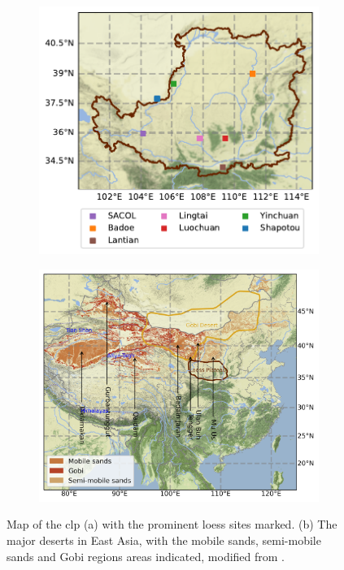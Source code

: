 \begin{figure}[htpb]
    \begin{subfigure}[b]{0.38\textwidth}
        \centering
        \includegraphics[width=\textwidth]{texfiles/figs/map_loess.pdf}
        \label{fig:map_clp_locations}
        \caption{}
    \end{subfigure}
    \hfill
    \begin{subfigure}[b]{0.58\textwidth}
        \centering
        \includegraphics[width=\textwidth]{texfiles/figs/map_sources_china.png}
        \label{fig:map_deserts}
        \caption{}
    \end{subfigure}
    
    \caption{Map of the \acrshort{clp} (a) with the prominent loess sites marked. (b) The major deserts in East Asia, with the mobile sands, semi-mobile sands and Gobi regions areas indicated, modified from \textcite{mao2013numerical}. }
    \label{fig:maps_clp_deserts}
\end{figure}


